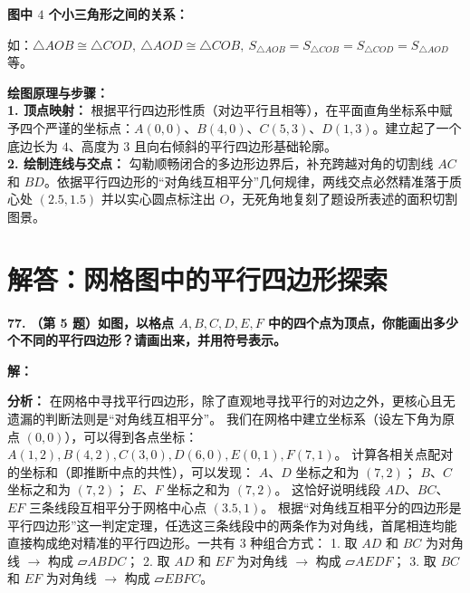 \documentclass[12pt, a4paper]{ctexrep}
\begin{document}
\vspace{0.4cm}
\textbf{图中 $4$ 个小三角形之间的关系：}

如：$\triangle AOB \cong \triangle COD,\ \triangle AOD \cong \triangle COB,\ S_{\triangle AOB} = S_{\triangle COB} = S_{\triangle COD} = S_{\triangle AOD}$ 等。

\vspace{0.4cm}
{\small\color{blue!70!black}
\textbf{绘图原理与步骤：}\\
\textbf{1. 顶点映射：} 根据平行四边形性质（对边平行且相等），在平面直角坐标系中赋予四个严谨的坐标点：$A(0, 0)$、$B(4, 0)$、$C(5, 3)$、$D(1, 3)$。建立起了一个底边长为 $4$、高度为 $3$ 且向右倾斜的平行四边形基础轮廓。\\
\textbf{2. 绘制连线与交点：} 勾勒顺畅闭合的多边形边界后，补充跨越对角的切割线 $AC$ 和 $BD$。依据平行四边形的“对角线互相平分”几何规律，两线交点必然精准落于质心处 $(2.5, 1.5)$ 并以实心圆点标注出 $O$，无死角地复刻了题设所表述的面积切割图景。
}

\newpage

\section{解答：网格图中的平行四边形探索}

\vspace{0.6cm}

\textbf{\LARGE 77.} \textbf{（第 5 题）如图，以格点 $A, B, C, D, E, F$ 中的四个点为顶点，你能画出多少个不同的平行四边形？请画出来，并用符号表示。}

\vspace{0.4cm}
\textbf{解：}

\textbf{分析：} 在网格中寻找平行四边形，除了直观地寻找平行的对边之外，更核心且无遗漏的判断法则是“对角线互相平分”。
我们在网格中建立坐标系（设左下角为原点 $(0,0)$），可以得到各点坐标：
$A(1,2), B(4,2), C(3,0), D(6,0), E(0,1), F(7,1)$。
计算各相关点配对的坐标和（即推断中点的共性），可以发现：
$A、D$ 坐标之和为 $(7,2)$；
$B、C$ 坐标之和为 $(7,2)$；
$E、F$ 坐标之和为 $(7,2)$。
这恰好说明线段 $AD$、$BC$、$EF$ 三条线段互相平分于网格中心点 $(3.5, 1)$。
根据“对角线互相平分的四边形是平行四边形”这一判定定理，任选这三条线段中的两条作为对角线，首尾相连均能直接构成绝对精准的平行四边形。一共有 $3$ 种组合方式：
1. 取 $AD$ 和 $BC$ 为对角线 $\to$ 构成 $\mathord{▱} ABDC$；
2. 取 $AD$ 和 $EF$ 为对角线 $\to$ 构成 $\mathord{▱} AEDF$；
3. 取 $BC$ 和 $EF$ 为对角线 $\to$ 构成 $\mathord{▱} EBFC$。
\end{document}
